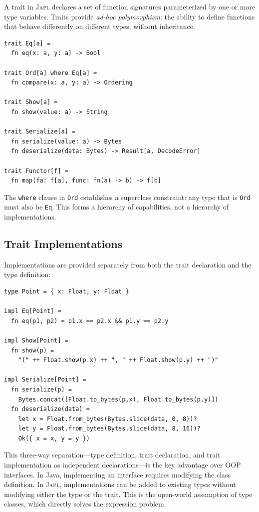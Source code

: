 \documentclass[11pt,a4paper]{article}
\newcommand{\japl}{\textsc{Japl}}
\begin{document}
A trait in \japl{} declares a set of function signatures parameterized by one or more type variables. Traits provide \emph{ad-hoc polymorphism}: the ability to define functions that behave differently on different types, without inheritance.

\begin{lstlisting}
trait Eq[a] =
  fn eq(x: a, y: a) -> Bool

trait Ord[a] where Eq[a] =
  fn compare(x: a, y: a) -> Ordering

trait Show[a] =
  fn show(value: a) -> String

trait Serialize[a] =
  fn serialize(value: a) -> Bytes
  fn deserialize(data: Bytes) -> Result[a, DecodeError]

trait Functor[f] =
  fn map(fa: f[a], func: fn(a) -> b) -> f[b]
\end{lstlisting}

The \texttt{where} clause in \texttt{Ord} establishes a superclass constraint: any type that is \texttt{Ord} must also be \texttt{Eq}. This forms a hierarchy of capabilities, not a hierarchy of implementations.

\subsection{Trait Implementations}

Implementations are provided separately from both the trait declaration and the type definition:

\begin{lstlisting}
type Point = { x: Float, y: Float }

impl Eq[Point] =
  fn eq(p1, p2) = p1.x == p2.x && p1.y == p2.y

impl Show[Point] =
  fn show(p) =
    "(" ++ Float.show(p.x) ++ ", " ++ Float.show(p.y) ++ ")"

impl Serialize[Point] =
  fn serialize(p) =
    Bytes.concat([Float.to_bytes(p.x), Float.to_bytes(p.y)])
  fn deserialize(data) =
    let x = Float.from_bytes(Bytes.slice(data, 0, 8))?
    let y = Float.from_bytes(Bytes.slice(data, 8, 16))?
    Ok({ x = x, y = y })
\end{lstlisting}

This three-way separation---type definition, trait declaration, and trait implementation as independent declarations---is the key advantage over OOP interfaces. In Java, implementing an interface requires modifying the class definition. In \japl{}, implementations can be added to existing types without modifying either the type or the trait. This is the open-world assumption of type classes, which directly solves the expression problem.
\end{document}
